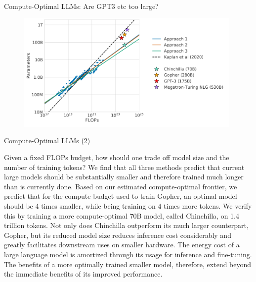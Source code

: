 \begin{vbframe}{Compute-Optimal LLM\MakeLowercase{s}: Are GPT3 etc too large?}

\vfill

\begin{figure}
	\centering
	\includegraphics[width = 11cm]{./figure/chinchilla.png} \\ 
\end{figure}

\vfill

\end{vbframe}


\begin{vbframe}{Compute-Optimal LLM\MakeLowercase{s} (2)}

Given a fixed FLOPs budget, how should one trade off model size and
the number of training tokens? We find that all three methods predict
that current large models should be substantially smaller and therefore
trained much longer than is currently done. Based on our estimated
compute-optimal frontier, we predict that for the compute budget used
to train Gopher, an optimal model should be 4 times smaller, while
being training on 4 times more tokens. We verify this by training a more
compute-optimal 70B model, called Chinchilla, on 1.4 trillion tokens.
Not only does Chinchilla outperform its much larger counterpart,
Gopher, but its reduced model size reduces inference cost considerably
and greatly facilitates downstream uses on smaller hardware. The
energy cost of a large language model is amortized through its usage
for inference and fine-tuning. The benefits of a more optimally trained
smaller model, therefore, extend beyond the immediate benefits of its
improved performance.

\end{vbframe}

